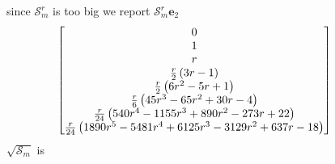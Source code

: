 since $\mathcal{S}_{m}^{r}$ is too big we report $\mathcal{S}_{m}^{r}\boldsymbol{e}_{2}$ 
\begin{displaymath}
\hspace{-1cm}
\left[\begin{matrix} 0 \\ 1 \\ r \\ \frac{r}{2} \left(3 r - 1\right) \\ \frac{r}{2} \left(6 r^{2} - 5 r + 1\right) \\ \frac{r}{6} \left(45 r^{3} - 65 r^{2} + 30 r - 4\right) \\ \frac{r}{24} \left(540 r^{4} - 1155 r^{3} + 890 r^{2} - 273 r + 22\right) \\ \frac{r}{24} \left(1890 r^{5} - 5481 r^{4} + 6125 r^{3} - 3129 r^{2} + 637 r - 18\right) \end{matrix}\right]
\end{displaymath}
$\sqrt{\mathcal{S}_{m}}$ is
